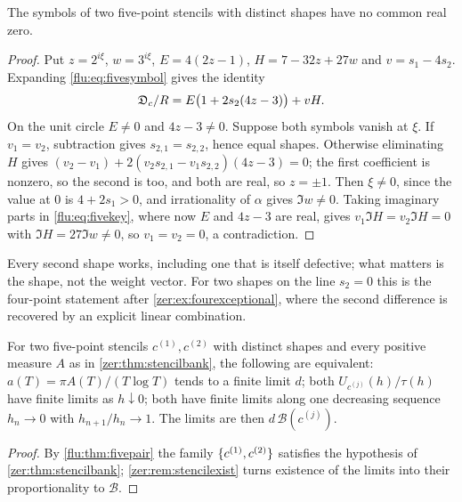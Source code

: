 \begin{theorem}\label{flu:thm:fivepair}
The symbols of two five-point stencils with distinct shapes have no common real zero.
\end{theorem}
\begin{proof}
Put $z=2^{i\xi}$, $w=3^{i\xi}$, $E=4(2z-1)$, $H=7-32z+27w$ and $v=s_1-4s_2$. Expanding \eqref{flu:eq:fivesymbol}
gives the identity
\begin{equation}\label{flu:eq:fivekey}
 \mathfrak{D}_c/R=E\bigl(1+2s_2(4z-3)\bigr)+vH .
\end{equation}
On the unit circle $E\ne0$ and $4z-3\ne0$. Suppose both symbols vanish at $\xi$. If $v_1=v_2$, subtraction gives
$s_{2,1}=s_{2,2}$, hence equal shapes. Otherwise eliminating $H$ gives
$(v_2-v_1)+2(v_2s_{2,1}-v_1s_{2,2})(4z-3)=0$; the first coefficient is nonzero, so the second is too, and both are
real, so $z=\pm1$. Then $\xi\ne0$, since the value at $0$ is $4+2s_1>0$, and irrationality of $\alpha$ gives
$\Im w\ne0$. Taking imaginary parts in \eqref{flu:eq:fivekey}, where now $E$ and $4z-3$ are real, gives
$v_1\Im H=v_2\Im H=0$ with $\Im H=27\Im w\ne0$, so $v_1=v_2=0$, a contradiction.
\end{proof}

Every second shape works, including one that is itself defective; what matters is the shape, not the weight
vector. For two shapes on the line $s_2=0$ this is the four-point statement after \cref{zer:ex:fourexceptional},
where the second difference is recovered by an explicit linear combination.

\begin{corollary}\label{flu:cor:fiverecover}
For two five-point stencils $c^{(1)},c^{(2)}$ with distinct shapes and every positive measure $A$ as in
\cref{zer:thm:stencilbank}, the following are equivalent: $a(T)=\pi A(T)/(T\log T)$ tends to a finite limit
$d$; both $U_{c^{(j)}}(h)/\tau(h)$ have finite limits as $h\downarrow0$; both have finite limits along one
decreasing sequence $h_n\to0$ with $h_{n+1}/h_n\to1$. The limits are then $d\,\mathcal B(c^{(j)})$.
\end{corollary}
\begin{proof}
By \cref{flu:thm:fivepair} the family $\{c^{(1)},c^{(2)}\}$ satisfies the hypothesis of
\cref{zer:thm:stencilbank}; \cref{zer:rem:stencilexist} turns existence of the limits into their proportionality
to $\mathcal B$.
\end{proof}


